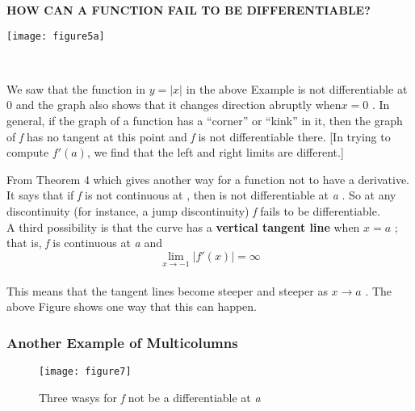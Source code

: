 \documentclass[12pt, a4paper]{article}
\begin{document}
	\begin{multicols}{2}
\noindent \textbf {HOW CAN A FUNCTION FAIL TO BE DIFFERENTIABLE?}

\noindent\begin{minipage}{0.3\textwidth}  %
\texttt{[image: figure5a]}
\end{minipage}%
\\ \linebreak

	
\noindent We saw that the function in $y = |x| $ in the above Example is not differentiable at 0 and the graph also shows that it changes direction abruptly when$x=0$ . In general, if the graph of a function has a “corner” or “kink” in it, then the graph of \emph{f} has no tangent at this point and \emph{f} is not differentiable there. [In trying to compute $f'(a)$, we find that the left and right limits are different.]

\noindent 
From Theorem 4 which gives another way for a function not to have a derivative. It says that if \emph{f} is not continuous at , then is not differentiable at \emph{a} . So at any discontinuity (for instance, a jump discontinuity) \emph{f} fails to be differentiable.\\
A third possibility is that the curve has a \textbf {vertical tangent line} when $x= a$ ; that is, \emph{f} is continuous at \emph{a} and $$\displaystyle\lim_{x \to -1} {|f'(x)|}=\infty  $$\\
This means that the tangent lines become steeper and steeper as $x \rightarrow a$ .
 The above Figure shows one way that this can happen.
 
\end{multicols}
\pagebreak
{}	
\subsubsection*{Another Example of Multicolumns}


\begin{figure}[h]
\texttt{[image: figure7]}
\caption{Three wasys for \emph{f} not be a differentiable at \emph{a}}
\label{2}
\end{figure}
\end{document}
